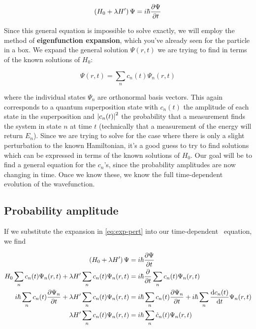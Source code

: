 \begin{equation}
	\left(H_0 + \lambda H'\right)\Psi = i\hbar \pdv{\Psi}{t} \label{eq:sch-pert}
\end{equation}

Since this general equation is impossible to solve exactly, we will employ the method of \textbf{eigenfunction expansion}, which you've already seen for the particle in a box. 
We expand the general solution $\Psi(r,t)$ we are trying to find in terms of the known solutions of $H_0$:

\begin{equation}
	\Psi(r,t) = \sum_n c_n(t) \Psi_n(r,t) \label{eq:exp-pert}
\end{equation}

\noindent where the individual states $\Psi_n$ are orthonormal basis vectors. 
This again corresponds to a quantum superposition state with $c_n(t)$ the amplitude of each state in the superposition and $\abs{c_n(t)}^2$ the probability that a measurement finds the system in state $n$ at time $t$ (technically that a measurement of the energy will return $E_n$). 
Since we are trying to solve for the case where there is only a slight perturbation to the known Hamiltonian, it's a good guess to try to find solutions which can be expressed in terms of the known solutions of $H_0$. 
Our goal will be to find a general equation for the $c_n$'s, since the probability amplitudes are now changing in time. 
Once we know these, we know the full time-dependent evolution of the wavefunction. 


\subsection{Probability amplitude}

If we substitute the expansion in \autoref{eq:exp-pert} into our time-dependent \Sch\ equation, we find

\begin{align*}
	\left(H_0 + \lambda H'\right)\Psi &= i\hbar \pdv{\Psi}{t} \\
	H_0 \sum_n c_n(t) \Psi_n(r,t) + \lambda H'\sum_n c_n(t) \Psi_n(r,t) &= i\hbar \pdv{t}\sum_n c_n(t) \Psi_n(r,t) \\
	i\hbar\sum_n c_n(t) \pdv{\Psi_n}{t} + \lambda H'\sum_n c_n(t) \Psi_n(r,t) &= i\hbar \sum_n c_n(t) \pdv{\Psi_n}{t} + i\hbar \sum_n \dv{c_n(t)}{t} \Psi_n(r,t) \\
	\lambda H'\sum_n c_n(t) \Psi_n(r,t) &= i\hbar \sum_n \dot{c}_n(t) \Psi_n(r,t)
\end{align*}

